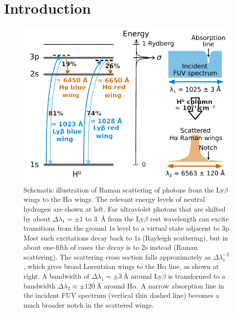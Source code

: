 \documentclass[useAMS, usenatbib, a4paper]{mnras}
\newcommand\Config[1]{\ensuremath{\mathrm{#1}}}
\newcommand\ha{\ensuremath{\text{H}\alpha}}
\newcommand\lyb{\ensuremath{\text{Ly}\beta}}
\begin{document}
\section{Introduction}
\label{sec:introduction}

\begin{figure}
  \centering
  \includegraphics[width=\linewidth]{figs/raman-cartoon}
  \caption{Schematic illustration of Raman scattering of photons from
    the \lyb{} wings to the \ha{} wings.  The relevant energy levels
    of neutral hydrogen are shown at left.  Far ultraviolet photons
    that are shifted by about \(\Delta\lambda_1 = \pm 1\) to \SI{3}{\angstrom}
    from the \lyb{} rest wavelength can excite transitions from the
    ground \Config{1s} level to a virtual state adjacent to
    \Config{3p}.  Most such excitations decay back to \Config{1s}
    (Rayleigh scattering), but in about one-fifth of cases the decay
    is to \Config{2s} instead (Raman scattering).  The scattering
    cross section falls approximately as \(\Delta\lambda_1^{-2}\), which gives
    broad Lorentzian wings to the \ha{} line, as shown at right. A
    bandwidth of \(\Delta\lambda_1 = \pm \SI{3}{\angstrom}\) around \lyb{} is
    transformed to a bandwidth
    \(\Delta\lambda_2 \approx \pm \SI{120}{\angstrom}\) around \ha{}.  A narrow
    absorption line in the incident FUV spectrum (vertical thin dashed
    line) becomes a much broader notch in the scattered wings. }
  \label{fig:raman-cartoon}
\end{figure}
\end{document}
